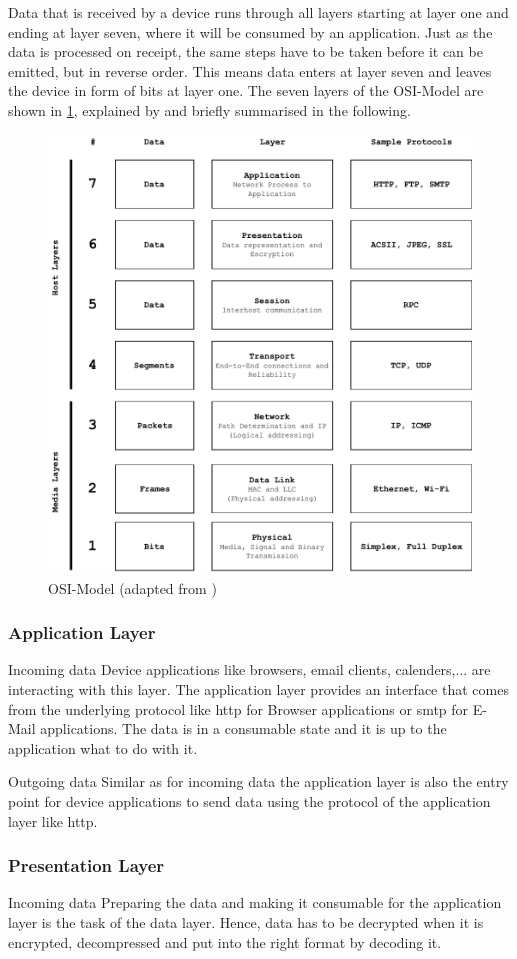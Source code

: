 Data that is received by a device runs through all layers starting at layer one and ending at layer seven, where it will be consumed by an application. Just as the data is processed on receipt, the same steps have to be taken before it can be emitted, but in reverse order. This means data enters at layer seven and leaves the device in form of bits at layer one.
The seven layers of the OSI-Model are shown in \cref{fig:osimodel}, explained by \citet{osi-model-explained} and briefly summarised in the following.

\begin{figure}
\centering
\includegraphics[width=.5\textwidth]{graphics/osi-modell.pdf}
\caption{OSI-Model (adapted from \citet{wiki:osi-model})}
\label{fig:osimodel}
\end{figure}

\subsubsection{Application Layer}
Incoming data\newline
Device applications like browsers, email clients, calenders,... are interacting with this layer. The application layer provides an interface that comes from the underlying protocol like \gls{http} for Browser applications or \gls{smtp} for E-Mail applications. The data is in a consumable state and it is up to the application what to do with it.

Outgoing data\newline
Similar as for incoming data the application layer is also the entry point for device applications to send data using the protocol of the application layer like \gls{http}. 


\subsubsection{Presentation Layer}
Incoming data\newline
Preparing the data and making it consumable for the application layer is the task of the data layer. 
Hence, data has to be decrypted when it is encrypted, decompressed and put into the right format by decoding it.

